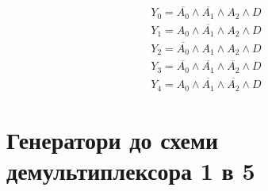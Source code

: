 \documentclass{article}
\begin{document}
\begin{normalsize}
	\begin{Large}
		\begin{gather}
			Y_0=\overline{A_0}\land\overline{A_1}\land A_2\land D\nonumber\\
			Y_1=A_0\land\overline{A_1}\land A_2\land D\nonumber\\
			Y_2=\overline{A_0}\land A_1\land A_2\land D\nonumber\\
			Y_3=\overline{A_0}\land\overline{A_1}\land\overline{A_2}\land D\nonumber\\
			Y_4=A_0\land\overline{A_1}\land\overline{A_2}\land D\nonumber
		\end{gather}
	\end{Large}

	\section*{Генератори до схеми демультиплексора 1 в 5}
	\begin{figure}[H]
		\centering
		\hspace{5px}
		

\end{figure}
\end{normalsize}
\end{document}
